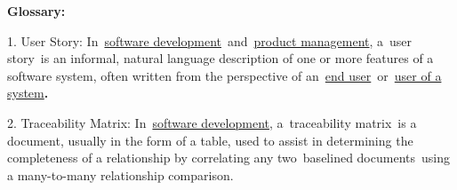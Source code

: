 \documentclass[12pt]{article}
\begin{document}
 \par


\vspace{\baselineskip}
\setlength{\parskip}{0.0pt}

\vspace{\baselineskip}

\vspace{\baselineskip}
\setlength{\parskip}{8.04pt}

\vspace{\baselineskip}

\vspace{\baselineskip}

\vspace{\baselineskip}

\vspace{\baselineskip}

\vspace{\baselineskip}

\vspace{\baselineskip}

\vspace{\baselineskip}

\vspace{\baselineskip}

\vspace{\baselineskip}

\vspace{\baselineskip}

\vspace{\baselineskip}
{\fontsize{13pt}{15.6pt}\selectfont \textbf{Glossary:}\par}\par

\setlength{\parskip}{6.0pt}
1. User Story:\textbf{ }In \href{https://en.wikipedia.org/wiki/Software_development}{software development} and \href{https://en.wikipedia.org/wiki/Product_management}{product management}, a user story is an informal, natural language description of one or more features of a software system, often written from the perspective of an \href{https://en.wikipedia.org/wiki/User_(computing)}{end user} or \href{https://en.wikipedia.org/wiki/User_(system)}{user of a system}\textbf{.}\par

\setlength{\parskip}{2.04pt}
2. Traceability Matrix: In \href{https://en.wikipedia.org/wiki/Software_development}{software development}, a traceability matrix is a document, usually in the form of a table, used to assist in determining the completeness of a relationship by correlating any two baselined documents using a many-to-many relationship comparison.\par
\end{document}
